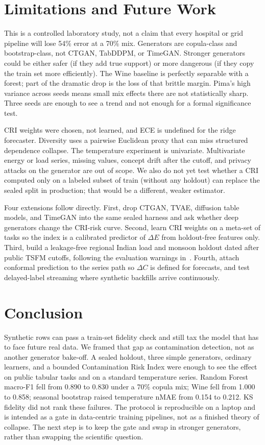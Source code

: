 \documentclass[conference]{IEEEtran}
\begin{document}
\section{Limitations and Future Work}
\label{sec:limits}
This is a controlled laboratory study, not a claim that every hospital or grid pipeline will lose 54\% error at a 70\% mix.
Generators are copula-class and bootstrap-class, not CTGAN, TabDDPM, or TimeGAN.
Stronger generators could be either safer (if they add true support) or more dangerous (if they copy the train set more efficiently).
The Wine baseline is perfectly separable with a forest; part of the dramatic drop is the loss of that brittle margin.
Pima's high variance across seeds means small mix effects there are not statistically sharp.
Three seeds are enough to see a trend and not enough for a formal significance test.

CRI weights were chosen, not learned, and ECE is undefined for the ridge forecaster.
Diversity uses a pairwise Euclidean proxy that can miss structured dependence collapse.
The temperature experiment is univariate.
Multivariate energy or load series, missing values, concept drift after the cutoff, and privacy attacks on the generator are out of scope.
We also do not yet test whether a CRI computed only on a labeled subset of train (without any holdout) can replace the sealed split in production; that would be a different, weaker estimator.

Four extensions follow directly.
First, drop CTGAN, TVAE, diffusion table models, and TimeGAN into the same sealed harness and ask whether deep generators change the CRI-risk curve.
Second, learn CRI weights on a meta-set of tasks so the index is a calibrated predictor of $\Delta E$ from holdout-free features only.
Third, build a leakage-free regional Indian load and monsoon holdout dated after public TSFM cutoffs, following the evaluation warnings in~\cite{meyer2025leakage,li2026tsfmaudit}.
Fourth, attach conformal prediction to the series path so $\Delta C$ is defined for forecasts, and test delayed-label streaming where synthetic backfills arrive continuously.

\section{Conclusion}
\label{sec:conclusion}
Synthetic rows can pass a train-set fidelity check and still tax the model that has to face future real data.
We framed that gap as contamination detection, not as another generator bake-off.
A sealed holdout, three simple generators, ordinary learners, and a bounded Contamination Risk Index were enough to see the effect on public tabular tasks and on a standard temperature series.
Random Forest macro-F1 fell from 0.890 to 0.830 under a 70\% copula mix; Wine fell from 1.000 to 0.858; seasonal bootstrap raised temperature nMAE from 0.154 to 0.212.
KS fidelity did not rank these failures.
The protocol is reproducible on a laptop and is intended as a gate in data-centric training pipelines, not as a finished theory of collapse.
The next step is to keep the gate and swap in stronger generators, rather than swapping the scientific question.
\end{document}
